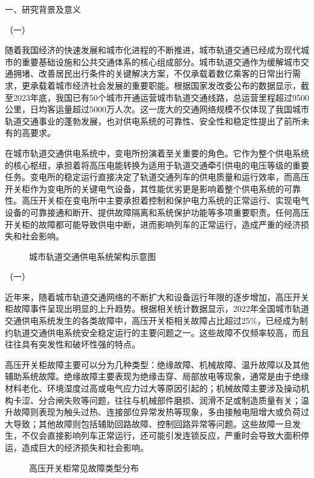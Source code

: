 一、研究背景及意义

（一）

随着我国经济的快速发展和城市化进程的不断推进，城市轨道交通已经成为现代城市的重要基础设施和公共交通体系的核心组成部分。城市轨道交通作为缓解城市交通拥堵、改善居民出行条件的关键解决方案，不仅承载着数亿乘客的日常出行需求，更承载着城市经济社会发展的重要职能。根据国家发改委公布的数据显示，截至2023年底，我国已有50个城市开通运营城市轨道交通线路，总运营里程超过9500公里，日均客运量超过5000万人次。这一庞大的交通网络规模不仅体现了我国城市轨道交通事业的蓬勃发展，也对供电系统的可靠性、安全性和稳定性提出了前所未有的高要求。

在城市轨道交通供电系统中，变电所扮演着至关重要的角色。它作为整个供电系统的核心枢纽，承担着将高压电能转换为适用于轨道交通牵引供电的电压等级的重要任务。变电所的稳定运行直接决定了轨道交通列车的供电质量和运行效率，而高压开关柜作为变电所的关键电气设备，其性能优劣更是影响着整个供电系统的可靠性。高压开关柜在变电所中主要承担着控制和保护电力系统的正常运行、实现电气设备的可靠接通和断开、提供故障隔离和系统保护功能等多项重要职责。任何高压开关柜的故障都可能导致供电中断，进而影响列车的正常运行，造成严重的经济损失和社会影响。

\begin{figure}[h]
\centering
\caption{城市轨道交通供电系统架构示意图}
\label{fig:railway_power_system}
\end{figure}

（一）

近年来，随着城市轨道交通网络的不断扩大和设备运行年限的逐步增加，高压开关柜故障事件呈现出明显的上升趋势。根据相关统计数据显示，2022年全国城市轨道交通供电系统发生的各类故障中，高压开关柜相关故障占比超过25\%，已经成为制约轨道交通供电系统安全稳定运行的主要问题之一。这些故障不仅频率较高，而且往往具有突发性和破坏性强的特点。

高压开关柜故障主要可以分为几种类型：绝缘故障、机械故障、温升故障以及其他辅助系统故障。绝缘故障主要表现为绝缘击穿、局部放电等现象，通常是由于绝缘材料老化、环境湿度过高或电气应力过大等原因引起的；机械故障主要涉及操动机构卡涩、分合闸失败等问题，往往与机械部件磨损、润滑不足或制造质量有关；温升故障则表现为触头过热、连接部位异常发热等现象，多由接触电阻增大或负荷过大导致；其他故障则包括辅助回路故障、控制回路异常等问题。这些故障一旦发生，不仅会直接影响列车正常运行，还可能引发连锁反应，严重时会导致大面积停运，造成巨大的经济损失和社会影响。

\begin{figure}[h]
\centering
\caption{高压开关柜常见故障类型分布}
\label{fig:switchgear_fault_types}
\end{figure}

